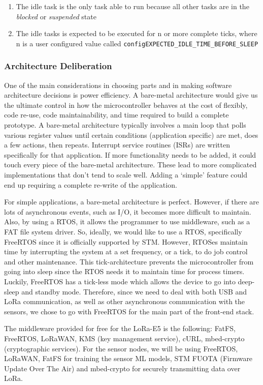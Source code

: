 \begin{enumerate}
	\item The idle task is the only task able to run because all other tasks are
		in the \emph{blocked} or \emph{suspended} state
	\item The idle tasks is expected to be executed for n or more complete ticks,
		where n is a user configured value called
		\texttt{configEXPECTED\_IDLE\_TIME\_BEFORE\_SLEEP}
\end{enumerate}

\subsubsection{Architecture Deliberation}
One of the main considerations in choosing parts and in making software
architecture decisions is power efficiency. A bare-metal architecture would
give us the ultimate control in how the microcontroller behaves at the cost of
flexibly, code re-use, code maintainability, and time required to build a
complete prototype. A bare-metal architecture typically involves a main loop
that polls various register values until certain conditions (application
specific) are met, does a few actions, then repeats. Interrupt service routines
(ISRs) are written specifically for that application. If more functionality
needs to be added, it could touch every piece of the bare-metal architecture.
These lead to more complicated implementations that don't tend to scale well.
Adding a `simple' feature could end up requiring a complete re-write of the
application.  

For simple applications, a bare-metal architecture is perfect.
However, if there are lots of asynchronous events, such as I/O, it becomes more
difficult to maintain. Also, by using a RTOS, it allows the programmer to use
middleware, such as a FAT file system driver. So, ideally, we would like to use
a RTOS, specifically FreeRTOS since it is officially supported by STM. However,
RTOSes maintain time by interrupting the system at a set frequency, or a tick,
to do job control and other maintenance.  This tick-architecture prevents the
microcontroller from going into sleep since the RTOS needs it to maintain time
for process timers. Luckily, FreeRTOS has a tick-less mode which allows the
device to go into deep-sleep and standby mode. Therefore, since we need to deal
with both USB and LoRa communication, as well as other asynchronous
communication with the sensors, we chose to go with FreeRTOS for the main part
of the front-end stack. 

The middleware provided for free for the LoRa-E5 is the
following: FatFS, FreeRTOS, LoRaWAN, KMS (key management service), cURL,
mbed-crypto (cryptographic services). For the sensor nodes, we will be using
FreeRTOS, LoRaWAN, FatFS for training the sensor ML models, STM FUOTA (Firmware
Update Over The Air) and mbed-crypto for securely transmitting data over LoRa.

